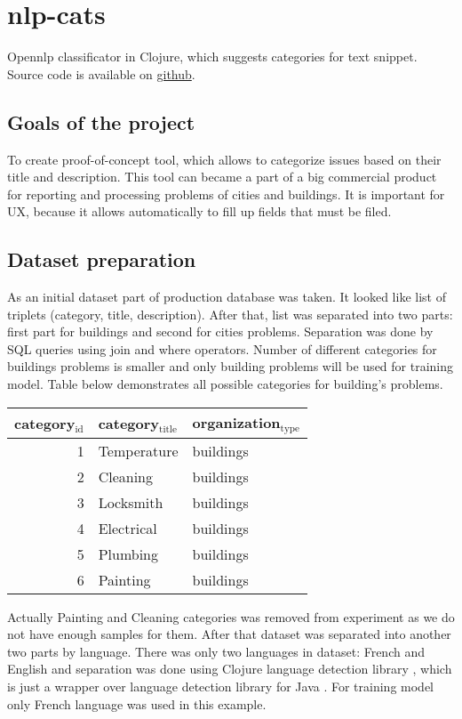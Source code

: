 \documentclass[14pt]{extarticle}
\author{Andrew Tropin}
\date{\today}
\title{}
\begin{document}
\tableofcontents

\section{nlp-cats}
\label{sec:org9837195}
Opennlp classificator in Clojure, which suggests categories for text snippet.
Source code is available on \href{https://github.com/abcdw/nlp-cats}{github}.

\subsection{Goals of the project}
\label{sec:org30ec016}
To create proof-of-concept tool, which allows to categorize issues based on
their title and description. This tool can became a part of a big commercial
product for reporting and processing problems of cities and buildings. It is
important for UX, because it allows automatically to fill up fields that must be
filed.

\subsection{Dataset preparation}
\label{sec:org65634f2}
As an initial dataset part of production database was taken. It looked like list
of triplets (category, title, description). After that, list was separated into
two parts: first part for buildings and second for cities problems. Separation
was done by SQL queries using join and where operators. Number of different
categories for buildings problems is smaller and only building problems will be
used for training model. Table below demonstrates all possible categories for
building's problems.

\begin{center}
\begin{tabular}{rll}
category\(_{\text{id}}\) & category\(_{\text{title}}\) & organization\(_{\text{type}}\)\\
\hline
1 & Temperature & buildings\\
2 & Cleaning & buildings\\
3 & Locksmith & buildings\\
4 & Electrical & buildings\\
5 & Plumbing & buildings\\
6 & Painting & buildings\\
\end{tabular}
\end{center}

Actually Painting and Cleaning categories was removed from experiment as we do
not have enough samples for them. After that dataset was separated into another
two parts by language. There was only two languages in dataset: French and
English and separation was done using Clojure language detection library
\cite{clojurelangdetect}, which is just a wrapper over language detection
library for Java \cite{nakatani2010langdetect}. For training model only French
language was used in this example.
\end{document}
